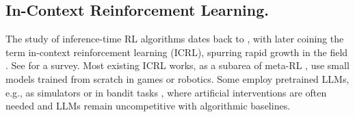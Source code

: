 \documentclass{article} %
\newcommand{\0}{\mathbf{0}}
\begin{document}
\subsection{In-Context Reinforcement Learning.}
The study of inference-time RL algorithms dates back to \citet{duan2016rl,wang2016learning}, with \citet{laskin2023incontext} later coining the term in-context reinforcement learning (ICRL), spurring rapid growth in the field \citep{kirsch2023towards,raparthy2023generalization,schmiedLargeRecurrentAction2024,lee2024supervised,zisman2023emergence,grigsby2023amago,lus42023,bauer2023human,wang2025transformers,cook2024artificial,xu2024meta,shi2024cross,huang2024context,liuEmergentAgenticTransformer2023,dai2024context}. See \citet{moeini2025survey} for a survey. Most existing ICRL works, as a subarea of meta-RL \citep{beck2023survey}, use small models trained from scratch in games or robotics. Some employ pretrained LLMs, e.g., as simulators \citep{brooks2024large,mirchandani_large_2023, resendiz2025parlpromptbasedagentsreinforcement} or in bandit tasks \citep{krishnamurthy2024can,nieEVOLvEEvaluatingOptimizing2024,park2024llm,monea2025llmsincontextbanditreinforcement}, where artificial interventions are often needed and LLMs remain uncompetitive with algorithmic baselines.
\end{document}
